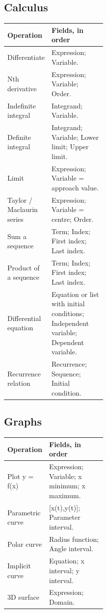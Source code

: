 \subsection{Calculus}
{\small
\begin{tabularx}{\linewidth}{@{}p{0.40\linewidth}X@{}}\toprule
Operation & Fields, in order\\\midrule
Differentiate & Expression; Variable.\\[3pt]
Nth derivative & Expression; Variable; Order.\\[3pt]
Indefinite integral & Integrand; Variable.\\[3pt]
Definite integral & Integrand; Variable; Lower limit; Upper limit.\\[3pt]
Limit & Expression; Variable = approach value.\\[3pt]
Taylor / Maclaurin series & Expression; Variable = centre; Order.\\[3pt]
Sum a sequence & Term; Index; First index; Last index.\\[3pt]
Product of a sequence & Term; Index; First index; Last index.\\[3pt]
Differential equation & Equation or list with initial conditions; Independent variable; Dependent variable.\\[3pt]
Recurrence relation & Recurrence; Sequence; Initial condition.\\[3pt]
\bottomrule\end{tabularx}}
\subsection{Graphs}
{\small
\begin{tabularx}{\linewidth}{@{}p{0.40\linewidth}X@{}}\toprule
Operation & Fields, in order\\\midrule
Plot y = f(x) & Expression; Variable; x minimum; x maximum.\\[3pt]
Parametric curve & [x(t),y(t)]; Parameter interval.\\[3pt]
Polar curve & Radius function; Angle interval.\\[3pt]
Implicit curve & Equation; x interval; y interval.\\[3pt]
3D surface & Expression; Domain.\\[3pt]
\bottomrule\end{tabularx}}
\clearpage
